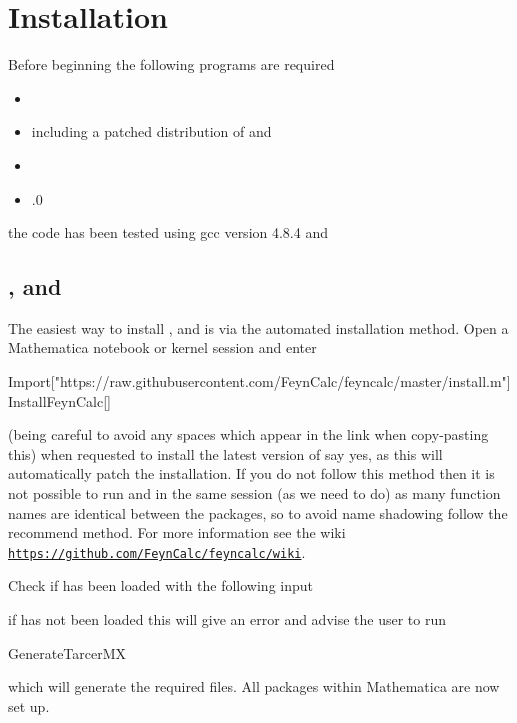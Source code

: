 \section{Installation}

Before beginning the following programs are required
\begin{itemize}
\item {}
\item {} including a patched distribution of  and 
\item {}
\item {}.0
\end{itemize}
the \mb \CC code has been tested using gcc version 4.8.4 and 

\subsection{\feyncalc, \feynarts and \tarcer}

The easiest way to install \feyncalc, \feynarts and \tarcer is via the automated installation method.  Open a Mathematica notebook or kernel session and enter
\begin{lstterm}
Import["https://raw.githubusercontent.com/FeynCalc/feyncalc/master/install.m"]
InstallFeynCalc[]
\end{lstterm}
(being careful to avoid any spaces which appear in the link when copy-pasting this) when requested to install the latest version of \feynarts say yes, as this will automatically patch the \feynarts installation.  If you do not follow this method then it is not possible to run \feynarts and \feyncalc in the same session (as we need to do) as many function names are identical between the packages, so to avoid name shadowing follow the recommend method.  For more information see the \feyncalc wiki \href{https://github.com/FeynCalc/feyncalc/wiki}{\lstinline{https://github.com/FeynCalc/feyncalc/wiki}}.

Check if \tarcer has been loaded with the following input
if \tarcer has not been loaded this will give an error and advise the user to run
\begin{lstterm}
GenerateTarcerMX
\end{lstterm}
which will generate the required files.  All packages within Mathematica are now set up.

